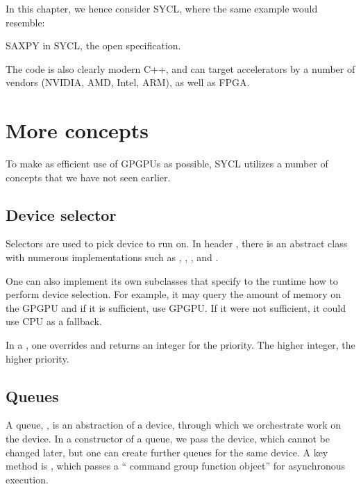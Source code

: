 In this chapter, we hence consider SYCL, where the same example would resemble:

\raggedbottom
\begin{codebox}[]{}
\footnotesize SAXPY in SYCL, the open specification.
\tcblower
{}
\end{codebox}

The code is also clearly modern C++, and can target accelerators by a number of vendors (NVIDIA, AMD, Intel, ARM), as well as FPGA.

\section{More concepts}

To make as efficient use of GPGPUs as possible, SYCL utilizes a number of concepts that 
we have not seen earlier.

\subsection{Device selector}

Selectors are used to pick device to run on.
In header , there is an abstract class  with numerous implementations
such as , , , and .

One can also implement its own subclasses that specify to the runtime how to perform device selection.
For example, it may query the amount of memory on the GPGPU and if it is sufficient, 
use GPGPU. If it were not sufficient, it could use CPU as a fallback. 

In a , one overrides 
and returns an integer for the priority. The higher integer, the higher priority. 

\subsection{Queues}

A queue, , is an abstraction of a device,
through which we orchestrate work on the device.
In a constructor of a queue, we pass the device, which cannot be changed later,
but one can create further queues for the same device.
A key method is ,
which passes a `` command group function object'' for asynchronous execution. 

